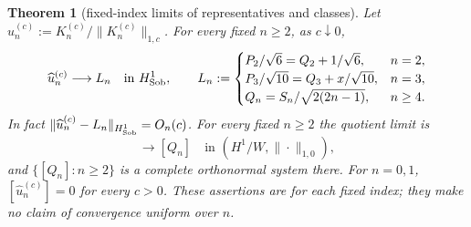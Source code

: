 ﻿\documentclass[11pt]{article}
\newtheorem{theorem}{Theorem}[section]
\begin{document}
\begin{theorem}[fixed-index limits of representatives and classes]\label{thm:unit}
	Let $\widehat u_n^{(c)}:=K_n^{(c)}/\|K_n^{(c)}\|_{1,c}$.
	For every fixed $n\ge2$, as $c\downarrow0$,
	\begin{equation}
		\widehat u_n^{(c)}\longrightarrow L_n
		\quad\text{in }H^1_{\rm Sob},\qquad
		L_n:=
		\begin{cases}
			P_2/\sqrt6=Q_2+1/\sqrt6,&n=2,\\
			P_3/\sqrt{10}=Q_3+x/\sqrt{10},&n=3,\\
			Q_n=S_n/\sqrt{2(2n-1)},&n\ge4.
		\end{cases}
		\label{eq:representative-limits}
	\end{equation}
	In fact $\|\widehat u_n^{(c)}-L_n\|_{H^1_{\rm Sob}}=O_n(c)$.
	For every fixed $n\ge2$ the quotient limit is
	\begin{equation}
		[\widehat u_n^{(c)}]\longrightarrow[Q_n]
		\quad\text{in }(H^1/W,\|\cdot\|_{1,0}),
		\label{eq:quotient-limits}
	\end{equation}
	and $\{[Q_n]:n\ge2\}$ is a complete orthonormal system there.
	For $n=0,1$, $[\widehat u_n^{(c)}]=0$ for every $c>0$.
	These assertions are for each fixed index; they make no claim of
	convergence uniform over $n$.
\end{theorem}
\end{document}
